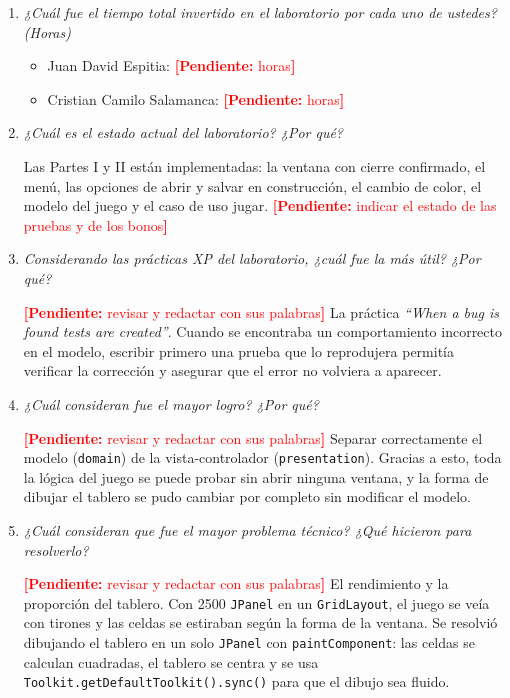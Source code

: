 \documentclass[12pt,letterpaper]{article}
\newcommand{\pendiente}[1]{\textcolor{red}{\textbf{[Pendiente:} #1\textbf{]}}}
\newcommand{\enunciado}[1]{\textit{#1}\par}
\begin{document}
\begin{enumerate}
  \item \enunciado{¿Cuál fue el tiempo total invertido en el laboratorio por cada uno de ustedes? (Horas)}

  \begin{itemize}
    \item Juan David Espitia: \pendiente{horas}
    \item Cristian Camilo Salamanca: \pendiente{horas}
  \end{itemize}

  \item \enunciado{¿Cuál es el estado actual del laboratorio? ¿Por qué?}

  Las Partes I y II están implementadas: la ventana con cierre confirmado, el menú, las opciones de abrir y salvar en construcción, el cambio de color, el modelo del juego y el caso de uso jugar. \pendiente{indicar el estado de las pruebas y de los bonos}

  \item \enunciado{Considerando las prácticas XP del laboratorio, ¿cuál fue la más útil? ¿Por qué?}

  \pendiente{revisar y redactar con sus palabras} La práctica \textit{``When a bug is found tests are created''}. Cuando se encontraba un comportamiento incorrecto en el modelo, escribir primero una prueba que lo reprodujera permitía verificar la corrección y asegurar que el error no volviera a aparecer.

  \item \enunciado{¿Cuál consideran fue el mayor logro? ¿Por qué?}

  \pendiente{revisar y redactar con sus palabras} Separar correctamente el modelo (\texttt{domain}) de la vista-controlador (\texttt{presentation}). Gracias a esto, toda la lógica del juego se puede probar sin abrir ninguna ventana, y la forma de dibujar el tablero se pudo cambiar por completo sin modificar el modelo.

  \item \enunciado{¿Cuál consideran que fue el mayor problema técnico? ¿Qué hicieron para resolverlo?}

  \pendiente{revisar y redactar con sus palabras} El rendimiento y la proporción del tablero. Con 2500 \texttt{JPanel} en un \texttt{GridLayout}, el juego se veía con tirones y las celdas se estiraban según la forma de la ventana. Se resolvió dibujando el tablero en un solo \texttt{JPanel} con \texttt{paintComponent}: las celdas se calculan cuadradas, el tablero se centra y se usa \texttt{Toolkit.getDefaultToolkit().sync()} para que el dibujo sea fluido.


\end{enumerate}
\end{document}
